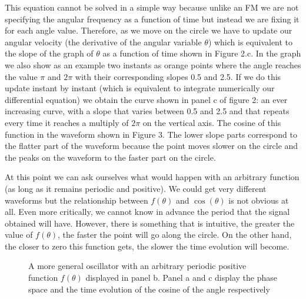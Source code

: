 \documentclass{article}
\begin{document}
This equation cannot be solved in a simple way because unlike an FM we are not specifying the angular frequency as a function of time but instead we are fixing it for each angle value. 
Therefore, as we move on the circle we have to update our angular velocity (the derivative of the angular variable $\theta$) which is equivalent to the slope of the graph of $\theta$ as a function of time shown in Figure 2.c. 
In the graph we also show as an example two instants as orange points where the angle reaches the value $\pi$ and $2\pi$ with their corresponding slopes 0.5 and 2.5. 
If we do this update instant by instant (which is equivalent to integrate numerically our differential equation) we obtain the curve shown in panel c of figure 2: an ever increasing curve, with a slope that varies between 0.5 and 2.5 and that repeats every time it reaches a multiply of $2\pi$ on the vertical axis. 
The cosine of this function in the waveform shown in Figure 3. 
The lower slope parts correspond to the flatter part of the waveform because the point moves slower on the circle and the peaks on the waveform to the faster part on the circle.

At this point we can ask ourselves what would happen with an arbitrary function (as long as it remains periodic and positive). 
We could get very different waveforms but the relationship between $f(\theta)$ and $\cos(\theta)$ is not obvious at all. 
Even more critically, we cannot know in advance the period that the signal obtained will have. 
However, there is something that is intuitive, the greater the value of $f(\theta)$, the faster the point will go along the circle. 
On the other hand, the closer to zero this function gets, the slower the time evolution will become. 

\begin{figure}[h]
    \centering
    \caption{A more general oscillator with an arbitrary periodic positive function $f(\theta)$ displayed in panel b. Panel a and c display the 
    phase space and the time evolution of the cosine of the angle respectively} 
    \label{fig_adler3}
\end{figure}
\end{document}
